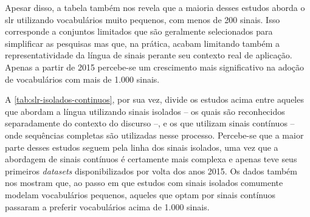 Apesar disso, a tabela também nos revela que a maioria desses estudos aborda o \acrshort{slr} utilizando vocabulários muito pequenos, com menos de 200 sinais. Isso corresponde a conjuntos limitados que são geralmente selecionados para simplificar as pesquisas mas que, na prática, acabam limitando também a representatividade da língua de sinais perante seu contexto real de aplicação.
Apenas a partir de 2015 percebe-se um crescimento mais significativo na adoção de vocabulários com mais de 1.000 sinais.







A \autoref{tab:slr-isolados-continuos}, por sua vez, divide os estudos acima entre aqueles que abordam a língua utilizando sinais isolados -- os quais são reconhecidos separadamente do contexto do discurso --, e os que utilizam sinais contínuos -- onde sequências completas são utilizadas nesse processo.
Percebe-se que a maior parte desses estudos seguem pela linha dos sinais isolados, uma vez que a abordagem de sinais contínuos é certamente mais complexa e apenas teve seus primeiros \textit{datasets} disponibilizados por volta dos anos 2015.
Os dados também nos mostram que, ao passo em que estudos com sinais isolados comumente modelam vocabulários pequenos, aqueles que optam por sinais contínuos passaram a preferir vocabulários acima de 1.000 sinais.%




